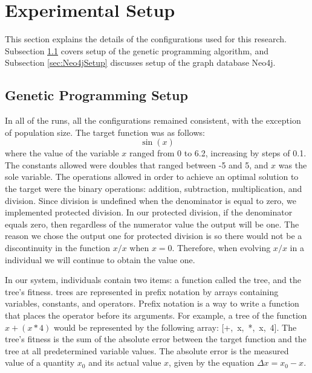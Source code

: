 \documentclass[12pt]{article}
\begin{document}





\section{Experimental Setup} 
\label{sec:experiments}

This section explains the details of the configurations used for this research. Subsection \ref{sec:GPSetup} covers setup of the genetic programming algorithm, and Subsection \ref{sec:Neo4jSetup} discusses setup of the graph database Neo4j.

\subsection{Genetic Programming Setup}
\label{sec:GPSetup}

In all of the runs, all the configurations remained consistent, with the exception of population size. The target function was as follows:
\[
	\sin(x)
\]
where the value of the variable $x$ ranged from 0 to 6.2, increasing by steps of 0.1. The constants allowed were doubles that ranged between -5 and 5, and $x$ was the sole variable. The operations allowed in order to achieve an optimal solution to the target were the binary operations: addition, subtraction, multiplication, and division. Since division is undefined when the denominator is equal to zero, we implemented protected division. In our protected division, if the denominator equals zero, then regardless of the numerator value the output will be one. The reason we chose the output one for protected division is so there would not be a discontinuity in the function $x/x$ when $x = 0$. Therefore, when evolving $x/x$ in a individual we will continue to obtain the value one.

In our system, individuals contain two items: a function called the tree, and the tree's fitness. trees are represented in prefix notation by arrays containing variables, constants, and operators. Prefix notation is a way to write  a function that places the operator before its arguments. For example, a tree of the function $x + (x * 4)$ would be represented by the following array: [+,~x,~*,~x,~4]. The tree's fitness is the sum of the absolute error between the target function and the tree at all predetermined variable values. The absolute error is  the measured value of a quantity $x_{0}$ and its actual value $x$, given by the equation $\Delta x=x_{0}-x$. 
\end{document}
